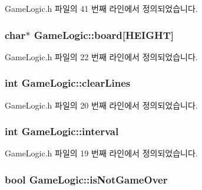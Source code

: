 Game\+Logic.\+h 파일의 41 번째 라인에서 정의되었습니다.

\subsubsection[{\texorpdfstring{board}{board}}]{\setlength{\rightskip}{0pt plus 5cm}char$\ast$ Game\+Logic\+::board\mbox{[}{\bf H\+E\+I\+G\+HT}\mbox{]}}\hypertarget{class_game_logic_a71071a20595279a580d18dfa60ed4a1c}{}\label{class_game_logic_a71071a20595279a580d18dfa60ed4a1c}


Game\+Logic.\+h 파일의 22 번째 라인에서 정의되었습니다.

\subsubsection[{\texorpdfstring{clear\+Lines}{clearLines}}]{\setlength{\rightskip}{0pt plus 5cm}int Game\+Logic\+::clear\+Lines}\hypertarget{class_game_logic_ab630a474170a2878d0c5ba8556e3fb39}{}\label{class_game_logic_ab630a474170a2878d0c5ba8556e3fb39}


Game\+Logic.\+h 파일의 20 번째 라인에서 정의되었습니다.

\subsubsection[{\texorpdfstring{interval}{interval}}]{\setlength{\rightskip}{0pt plus 5cm}int Game\+Logic\+::interval}\hypertarget{class_game_logic_ab9459c489b9c7bba90895756f373afc6}{}\label{class_game_logic_ab9459c489b9c7bba90895756f373afc6}


Game\+Logic.\+h 파일의 19 번째 라인에서 정의되었습니다.

\subsubsection[{\texorpdfstring{is\+Not\+Game\+Over}{isNotGameOver}}]{\setlength{\rightskip}{0pt plus 5cm}bool Game\+Logic\+::is\+Not\+Game\+Over\hspace{0.3cm}{\ttfamily [private]}}\hypertarget{class_game_logic_ae09fc4252ad9db62b810117567783880}{}\label{class_game_logic_ae09fc4252ad9db62b810117567783880}


